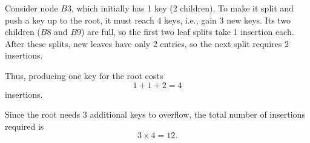 \documentclass[12pt,letterpaper, onecolumn]{exam}
\begin{document}
\begin{questions}
Consider node $B3$, which initially has 1 key (2 children). To make it split and push a key up to the root, it must reach 4 keys, i.e., gain 3 new keys. Its two children ($B8$ and $B9$) are full, so the first two leaf splits take 1 insertion each. After these splits, new leaves have only 2 entries, so the next split requires 2 insertions. 

Thus, producing one key for the root costs
\[
1 + 1 + 2 = 4
\]
insertions.

Since the root needs 3 additional keys to overflow, the total number of insertions required is
\[
3 \times 4 = 12.
\]
\end{questions}
\end{document}
